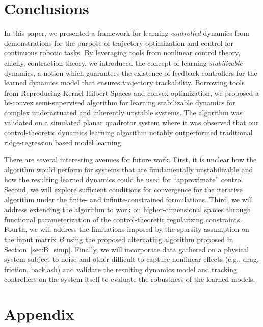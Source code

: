 \documentclass[conference]{svproc}
\renewcommand{\baselinestretch}{0.9}
\begin{document}
\section{Conclusions}
In this paper, we presented a framework for learning \emph{controlled} dynamics from demonstrations for the purpose of trajectory optimization and control for continuous robotic tasks. By leveraging tools from nonlinear control theory, chiefly, contraction theory, we introduced the concept of learning \emph{stabilizable} dynamics, a notion which guarantees the existence of feedback controllers for the learned dynamics model that ensures trajectory trackability. 
Borrowing tools from  Reproducing Kernel Hilbert Spaces and convex optimization, we proposed a bi-convex semi-supervised algorithm for learning stabilizable dynamics for complex underactuated and inherently unstable systems. The algorithm was validated on a simulated planar quadrotor system where it was observed that our control-theoretic dynamics learning algorithm notably outperformed traditional ridge-regression based model learning.

There are several interesting avenues for future work. First, it is unclear how the algorithm would perform for systems that are fundamentally unstabilizable and how the resulting learned dynamics could be used for ``approximate'' control. Second, we will explore sufficient conditions for convergence for the iterative algorithm under the finite- and infinite-constrained formulations. Third, we will address extending the algorithm to work on higher-dimensional spaces through functional parameterization of the control-theoretic regularizing constraints. Fourth, we will address the limitations imposed by the sparsity assumption on the input matrix $B$ using the proposed alternating algorithm proposed in Section~\ref{sec:B_simp}. Finally, we will incorporate data gathered on a physical system subject to noise and other difficult to capture nonlinear effects (e.g., drag, friction, backlash) and validate the resulting dynamics model and tracking controllers on the system itself to evaluate the robustness of the learned models.




\vspace{-3mm}
\renewcommand{\baselinestretch}{0.85}

% 


\newpage
\appendix
\renewcommand{\baselinestretch}{0.91}
\section*{Appendix}

\end{document}
